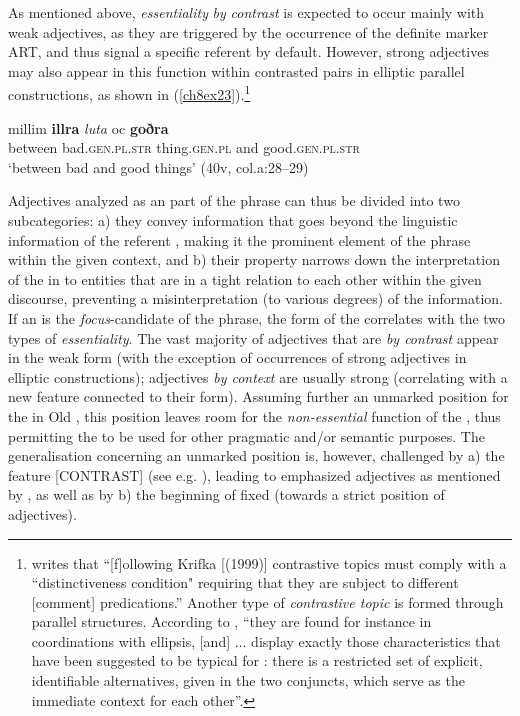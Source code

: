 \documentclass[output=paper,colorlinks,citecolor=brown]{langscibook}
\begin{document}
As mentioned above, \emph{essentiality} \emph{by} \emph{contrast} is
expected to occur mainly with weak adjectives, as they are triggered by
the occurrence of the definite marker ART, and thus signal a specific
referent by default. However, strong adjectives
may also appear in this function within contrasted pairs in elliptic parallel
constructions, as shown in (\ref{ch8ex23}).\footnote{\citet[209]{Umbach2005} writes that
  ``{[}f{]}ollowing Krifka {[}(1999){]} contrastive topics must comply
  with a ``distinctiveness condition" requiring that they are subject to
  different {[}comment{]} predications.'' Another type of
  \emph{contrastive topic} is formed through parallel structures.
  According to \citet[1343]{Repp2010}, ``they are found for instance in
  coordinations with ellipsis, {[}and{]} ... display exactly those
  characteristics that have been suggested to be typical for :
  there is a restricted set of explicit, identifiable alternatives,
  given in the two conjuncts, which serve as the immediate context for
  each other''.}

\begin{exe}
\ex\label{ch8ex23}
\gll millim \textbf{illra} \textit{luta} oc \textbf{goðra} \\
between bad.\textsc{gen.pl.str} thing.\textsc{gen.pl} and good.\textsc{gen.pl.str}\\
\glt `between bad and good things' (40v, col.a:28--29)
\end{exe}

Adjectives analyzed as an  part of the phrase can thus be
divided into two subcategories: a) they convey information that goes
beyond the linguistic information of the referent , making it the
prominent element of the phrase within the given context, and b) their
property narrows down the interpretation of the  in  to
entities that are in a tight relation to each other within the given
discourse, preventing a misinterpretation (to various degrees) of the
information. If an  is the \emph{focus}-candidate of the
phrase, the form of the  correlates with the two types of
\emph{essentiality}. The vast majority of adjectives that are
\emph{ by contrast} appear in the weak form (with the exception
of occurrences of strong adjectives in elliptic constructions);
adjectives \emph{ by context} are usually strong (correlating
with a new feature connected to their  form). Assuming further
an unmarked  position for the  in Old , this
position leaves room for the \emph{non-essential} function of the
, thus permitting the  to be used for other pragmatic
and/or semantic purposes. The generalisation concerning an unmarked  position is, however, challenged by
a) the feature {[}CONTRAST{]} (see e.g. \citealp{Rizzi1997}), leading to
emphasized  adjectives as mentioned by \citet{Faarlund04}, as
well as by b) the beginning of fixed  (towards a strict
 position of  adjectives).
\end{document}
